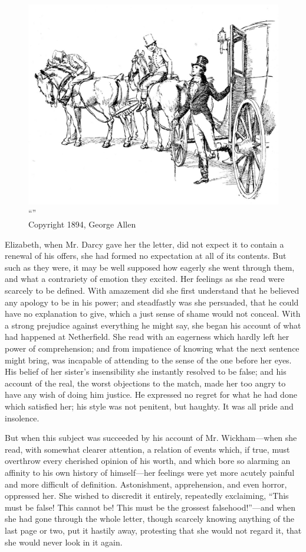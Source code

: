 \begin{figure}[htbp]
    \centering
    \includegraphics[width=\textwidth]{illustrations/i_031.jpg}
    \caption{“”\\ Copyright 1894, George Allen}
    \label{fig:image}
\end{figure}


Elizabeth, when Mr. Darcy gave her the letter, did not expect it to contain a renewal of his offers, she had formed no expectation at all of its contents. But such as they were, it may be well supposed how eagerly she went through them, and what a contrariety of emotion they excited. Her feelings as she read were scarcely to be defined. With amazement did she first understand that he believed any apology to be in his power; and steadfastly was she persuaded, that he could have no explanation to give, which a just sense of shame would not conceal. With a strong prejudice against everything he might say, she began his account of what had happened at Netherfield. She read with an eagerness which hardly left her power of comprehension; and from impatience of knowing what the next sentence might bring, was incapable of attending to the sense of the one before her eyes. His belief of her sister's insensibility she instantly resolved to be false; and his account of the real, the worst objections to the match, made her too angry to have any wish of doing him justice. He expressed no regret for what he had done which satisfied her; his style was not penitent, but haughty. It was all pride and insolence.

But when this subject was succeeded by his account of Mr. Wickham---when she read, with somewhat clearer attention, a relation of events which, if true, must overthrow every cherished opinion of his worth, and which bore so alarming an affinity to his own history of himself---her feelings were yet more acutely painful and more difficult of definition. Astonishment, apprehension, and even horror, oppressed her. She wished to discredit it entirely, repeatedly exclaiming, ``This must be false! This cannot be! This must be the grossest falsehood!''---and when she had gone through the whole letter, though scarcely knowing anything of the last page or two, put it hastily away, protesting that she would not regard it, that she would never look in it again.

